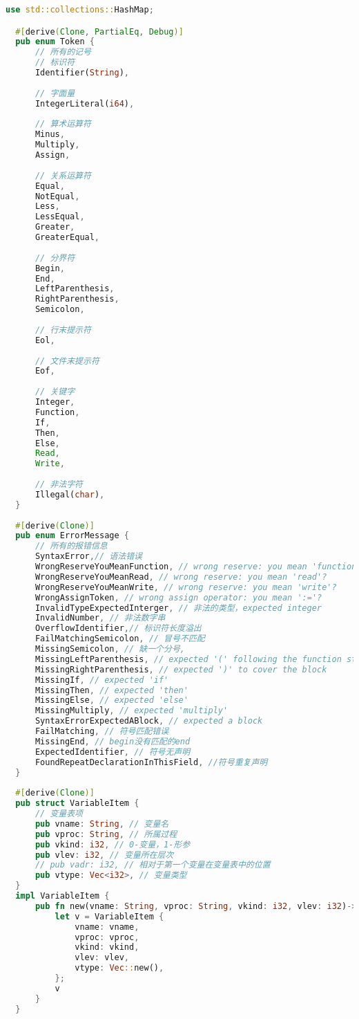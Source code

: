 \begin{lstlisting}[caption={符号表控制器env.rs}, label={5:code-example}, captionpos=t, language=rust]
  use std::collections::HashMap;

  #[derive(Clone, PartialEq, Debug)]
  pub enum Token {
      // 所有的记号
      // 标识符
      Identifier(String),
      
      // 字面量
      IntegerLiteral(i64),
  
      // 算术运算符
      Minus,
      Multiply,
      Assign,
  
      // 关系运算符
      Equal,
      NotEqual,
      Less,
      LessEqual,
      Greater,
      GreaterEqual,
  
      // 分界符
      Begin,
      End,
      LeftParenthesis,
      RightParenthesis,
      Semicolon,
  
      // 行末提示符
      Eol,
  
      // 文件末提示符
      Eof,
  
      // 关键字
      Integer,
      Function,
      If,
      Then,
      Else,
      Read,
      Write,
  
      // 非法字符
      Illegal(char),
  }
  
  #[derive(Clone)]
  pub enum ErrorMessage {
      // 所有的报错信息
      SyntaxError,// 语法错误
      WrongReserveYouMeanFunction, // wrong reserve: you mean 'function'?
      WrongReserveYouMeanRead, // wrong reserve: you mean 'read'?
      WrongReserveYouMeanWrite, // wrong reserve: you mean 'write'?
      WrongAssignToken, // wrong assign operator: you mean ':='?
      InvalidTypeExpectedInterger, // 非法的类型，expected integer
      InvalidNumber, // 非法数字串
      OverflowIdentifier,// 标识符长度溢出
      FailMatchingSemicolon, // 冒号不匹配
      MissingSemicolon, // 缺一个分号,
      MissingLeftParenthesis, // expected '(' following the function statement
      MissingRightParenthesis, // expected ')' to cover the block
      MissingIf, // expected 'if' 
      MissingThen, // expected 'then' 
      MissingElse, // expected 'else'
      MissingMultiply, // expected 'multiply'
      SyntaxErrorExpectedABlock, // expected a block
      FailMatching, // 符号匹配错误
      MissingEnd, // begin没有匹配的end
      ExpectedIdentifier, // 符号无声明
      FoundRepeatDeclarationInThisField, //符号重复声明
  }
  
  #[derive(Clone)]
  pub struct VariableItem {
      // 变量表项
      pub vname: String, // 变量名
      pub vproc: String, // 所属过程
      pub vkind: i32, // 0-变量，1-形参
      pub vlev: i32, // 变量所在层次
      // pub vadr: i32, // 相对于第一个变量在变量表中的位置
      pub vtype: Vec<i32>, // 变量类型 
  }
  impl VariableItem {
      pub fn new(vname: String, vproc: String, vkind: i32, vlev: i32)-> Self{
          let v = VariableItem {
              vname: vname,
              vproc: vproc,
              vkind: vkind,
              vlev: vlev,
              vtype: Vec::new(),
          };
          v
      }
  }
  

\end{lstlisting}
